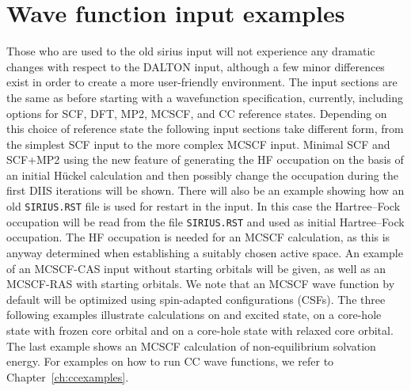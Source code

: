 \section{\label{examples} Wave function input examples}

Those who are used to the old {\sc sirius} input will not
experience any dramatic changes with respect to the DALTON input,
although a few minor differences exist in order to create a more
user-friendly environment. The input sections are the same as
before starting with a wavefunction specification, currently,
including options for SCF, DFT, MP2, MCSCF, and CC reference states.
Depending on this choice of reference state the following input
sections take different form, from the simplest SCF input to the
more complex MCSCF input. Minimal SCF and SCF+MP2
using the new feature of generating the HF
occupation on the basis of an initial H\"{u}ckel
calculation and then possibly change the
occupation during the first DIIS iterations will be
shown. There will also be an example showing how an old
\verb|SIRIUS.RST| file is used for restart in the
input. 
In this case the Hartree--Fock occupation will be read from
the file \verb|SIRIUS.RST| and used as initial Hartree--Fock
occupation.
The HF occupation is
needed for an MCSCF calculation, as this is anyway
determined when establishing a suitably chosen active
space. An example of an
MCSCF-CAS input without starting
orbitals will be given, as well as an
MCSCF-RAS with starting orbitals. We note that an
MCSCF wave function by default will be optimized using
spin-adapted configurations
(CSFs).
The three
following examples illustrate calculations on and excited
state, on a core-hole state
with frozen core orbital and on a core-hole
state with relaxed core orbital. The last
example shows an MCSCF calculation of non-equilibrium solvation
energy. For examples on how to run CC
wave functions, we refer to Chapter~\ref{ch:ccexamples}.

